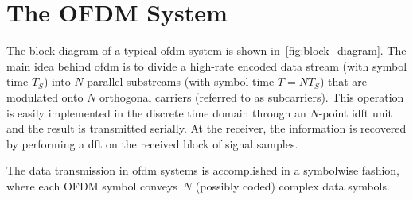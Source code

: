 \section{The OFDM System}\label{sec:ofdm-overview}

The block diagram of a typical \gls{ofdm} system is shown in~\cref{fig:block_diagram}. The main idea behind \gls{ofdm} is to divide a high-rate encoded data stream (with symbol time $T_S$) into $N$ parallel substreams (with symbol time $T = NT_S$) that are modulated onto $N$ orthogonal carriers (referred to as subcarriers). This operation is easily implemented in the discrete time domain through an $N$-point \gls{idft} unit and the result is transmitted serially. At the receiver, the information is recovered by performing a \gls{dft} on the received block of signal samples.
%

%
%
The data transmission in \gls{ofdm} systems is accomplished in a symbolwise fashion, where each OFDM symbol conveys~$N$ (possibly coded) complex data symbols. 

